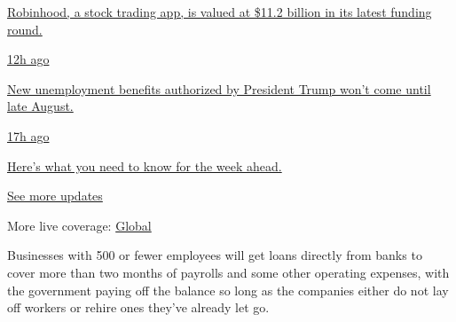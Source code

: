 \href{https://www.nytimes3xbfgragh.onion/live/2020/08/17/business/stock-market-today-coronavirus?action=click\&pgtype=Article\&state=default\&region=MAIN_CONTENT_1\&context=storylines_live_updates\#robinhood-a-stock-trading-app-is-valued-at-11-2-billion-in-its-latest-funding-round}{Robinhood,
a stock trading app, is valued at \$11.2 billion in its latest funding
round.}

\href{https://www.nytimes3xbfgragh.onion/live/2020/08/17/business/stock-market-today-coronavirus?action=click\&pgtype=Article\&state=default\&region=MAIN_CONTENT_1\&context=storylines_live_updates\#new-unemployment-benefits-authorized-by-president-trump-wont-come-until-late-august}{12h
ago}

\href{https://www.nytimes3xbfgragh.onion/live/2020/08/17/business/stock-market-today-coronavirus?action=click\&pgtype=Article\&state=default\&region=MAIN_CONTENT_1\&context=storylines_live_updates\#new-unemployment-benefits-authorized-by-president-trump-wont-come-until-late-august}{New
unemployment benefits authorized by President Trump won't come until
late August.}

\href{https://www.nytimes3xbfgragh.onion/live/2020/08/17/business/stock-market-today-coronavirus?action=click\&pgtype=Article\&state=default\&region=MAIN_CONTENT_1\&context=storylines_live_updates\#heres-what-you-need-to-know-for-the-week-ahead}{17h
ago}

\href{https://www.nytimes3xbfgragh.onion/live/2020/08/17/business/stock-market-today-coronavirus?action=click\&pgtype=Article\&state=default\&region=MAIN_CONTENT_1\&context=storylines_live_updates\#heres-what-you-need-to-know-for-the-week-ahead}{Here's
what you need to know for the week ahead.}

\href{https://www.nytimes3xbfgragh.onion/live/2020/08/17/business/stock-market-today-coronavirus?action=click\&pgtype=Article\&state=default\&region=MAIN_CONTENT_1\&context=storylines_live_updates}{See
more updates}

More live coverage:
\href{https://www.nytimes3xbfgragh.onion/2020/08/17/world/coronavirus-covid.html?action=click\&pgtype=Article\&state=default\&region=MAIN_CONTENT_1\&context=storylines_live_updates}{Global}

Businesses with 500 or fewer employees will get loans directly from
banks to cover more than two months of payrolls and some other operating
expenses, with the government paying off the balance so long as the
companies either do not lay off workers or rehire ones they've already
let go.

